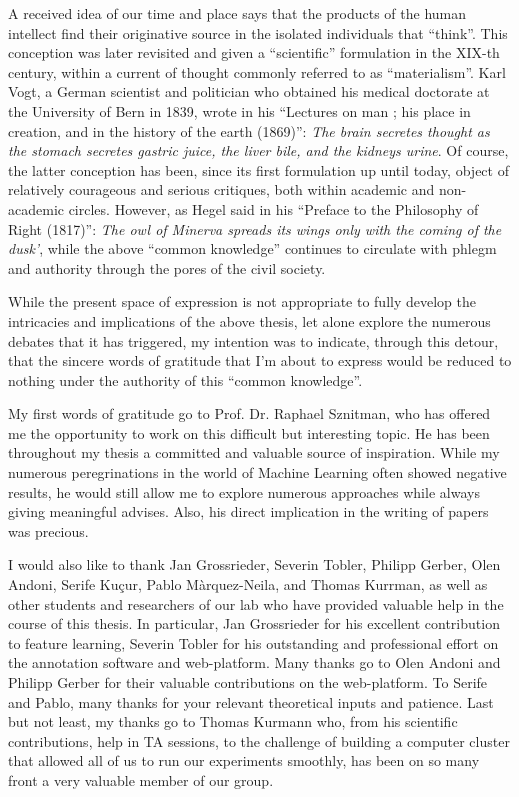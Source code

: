 \begin{acknowledgements}
\addchaptertocentry{\acknowledgementname} %
A received idea of our time and place says that the products of the human intellect find their originative source in the isolated individuals that ``think''.
This conception was later revisited and given a ``scientific'' formulation in the XIX-th century, within a current of thought commonly referred to as ``materialism''.
Karl Vogt, a German scientist and politician who obtained his medical doctorate at the University of Bern in 1839, wrote in his ``Lectures on man ; his place in creation, and in the history of the earth (1869)'':
\textit{The brain secretes thought as the stomach secretes gastric juice, the liver bile, and the kidneys urine}.
Of course, the latter conception has been, since its first formulation up until today, object of relatively courageous and serious critiques, both within academic and non-academic circles.
However, as Hegel said in his ``Preface to the Philosophy of Right (1817)'': \textit{The owl of Minerva spreads its wings only with the coming of the dusk’}, while the above ``common knowledge'' continues to circulate with phlegm and authority through the pores of the civil society.

While the present space of expression is not appropriate to fully develop the intricacies and implications of the above thesis, let alone explore the numerous debates that it has triggered, my intention was to indicate, through this detour, that the sincere words of gratitude that I'm about to express would be reduced to nothing under the authority of this ``common knowledge''.

\bigskip
My first words of gratitude go to Prof. Dr. Raphael Sznitman, who has offered me the opportunity to work on this difficult but interesting topic.
He has been throughout my thesis a committed and valuable source of inspiration.
While my numerous peregrinations in the world of Machine Learning often showed negative results, he would still allow me to explore numerous approaches while always giving meaningful advises.
Also, his direct implication in the writing of papers was precious.

\bigskip
I would also like to thank Jan Grossrieder, Severin Tobler, Philipp Gerber, Olen Andoni, Serife Kuçur, Pablo Màrquez-Neila, and Thomas Kurrman, as well as other students and researchers of our lab who have provided valuable help in the course of this thesis.
In particular, Jan Grossrieder for his excellent contribution to feature learning, Severin Tobler for his outstanding and professional effort on the annotation software and web-platform.
Many thanks go to Olen Andoni and Philipp Gerber for their valuable contributions on the web-platform.
To Serife and Pablo, many thanks for your relevant theoretical inputs and patience.
Last but not least, my thanks go to Thomas Kurmann who, from his scientific contributions, help in TA sessions, to the challenge of building a computer cluster that allowed all of us to run our experiments smoothly, has been on so many front a very valuable member of our group.


\end{acknowledgements}

